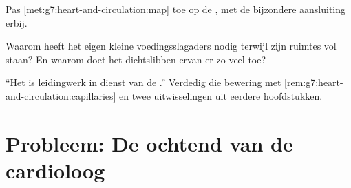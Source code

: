 \begin{exercise}[$\star\star$]\label{exo:g7:heart-and-circulation:10}
Pas \cref{met:g7:heart-and-circulation:map} toe op de , met de
bijzondere aansluiting erbij.
\end{exercise}

\begin{exercise}[$\star\star$]\label{exo:g7:heart-and-circulation:11}
Waarom heeft het  eigen kleine voedingsslagaders nodig terwijl zijn
ruimtes vol  staan? En waarom doet het dichtslibben ervan er zo veel
toe?
\end{exercise}

\begin{exercise}[$\star\star\star$]\label{exo:g7:heart-and-circulation:12}
``Het  is leidingwerk in dienst van de .'' Verdedig die
bewering met \cref{rem:g7:heart-and-circulation:capillaries} en twee
uitwisselingen uit eerdere hoofdstukken.
\end{exercise}

\section{Probleem: De ochtend van de cardioloog}

